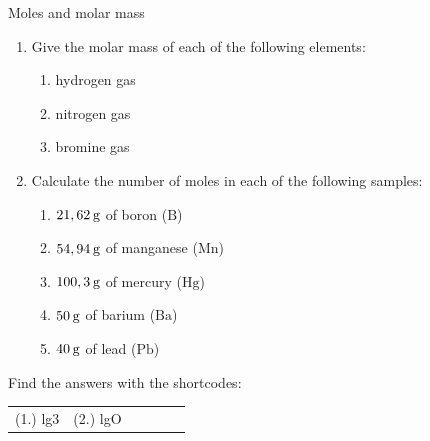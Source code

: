            \begin{exercises}{ Moles and molar mass
      }
            \nopagebreak
      \label{m38717*id277281}\begin{enumerate}[noitemsep, label=\textbf{\arabic*}. ] 
            \label{m38717*uid14}\item Give the molar mass of each of the following elements:
\label{m38717*id277295}\begin{enumerate}[noitemsep, label=\textbf{\alph*}. ] 
            \label{m38717*uid15}\item hydrogen gas
\label{m38717*uid16}\item nitrogen gas
\label{m38717*uid17}\item bromine gas
\end{enumerate}
                \label{m38717*uid18}\item Calculate the number of moles in each of the following samples:
\label{m38717*id277346}\begin{enumerate}[noitemsep, label=\textbf{\alph*}. ] 
            \label{m38717*uid19}\item $21,62\phantom{\rule{2pt}{0ex}}\text{g}$ of boron ($\text{B}$)
\label{m38717*uid20}\item $54,94\phantom{\rule{2pt}{0ex}}\text{g}$ of manganese ($\text{Mn}$)
\label{m38717*uid21}\item $100,3\phantom{\rule{2pt}{0ex}}\text{g}$ of mercury ($\text{Hg}$)
\label{m38717*uid22}\item $50\phantom{\rule{2pt}{0ex}}\text{g}$ of barium ($\text{Ba}$)
\label{m38717*uid23}\item $40\phantom{\rule{2pt}{0ex}}\text{g}$ of lead ($\text{Pb}$)
\end{enumerate}
                \end{enumerate}
    \label{m38717*cid4}
\par {} Find the answers with the shortcodes:
 \par \begin{tabular}[h]{cccccc}
 (1.) lg3  &  (2.) lgO  & \end{tabular}
\end{exercises}
